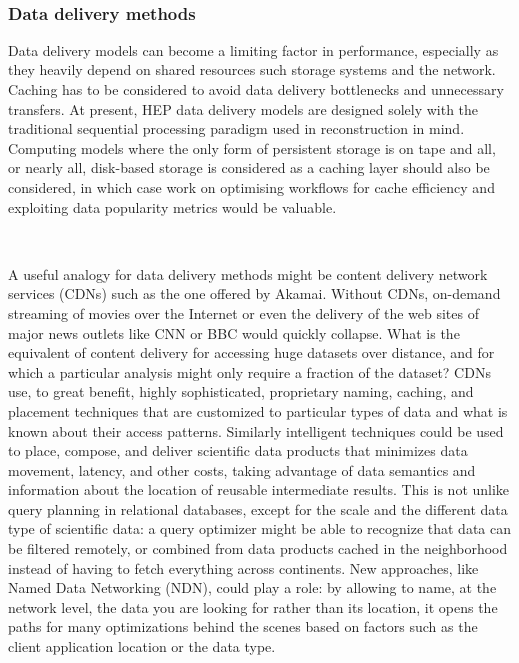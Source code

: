 \documentclass[12pt,a4paper]{article}
\begin{document}
~

\subsubsection{Data delivery methods}\label{data-delivery-methods}

Data delivery models can become a limiting factor in performance,
especially as they heavily depend on shared resources such storage
systems and the network. Caching has to be considered to avoid data
delivery bottlenecks and unnecessary transfers. At present, HEP data
delivery models are designed solely with the traditional sequential
processing paradigm used in reconstruction in mind. Computing models
where the only form of persistent storage is on tape and all, or nearly
all, disk-based storage is considered as a caching layer should also be
considered, in which case work on optimising workflows for cache
efficiency and exploiting data popularity metrics would be valuable.

~

A useful analogy for data delivery methods might be content delivery
network services (CDNs) such as the one offered by Akamai. Without CDNs,
on-demand streaming of movies over the Internet or even the delivery of
the web sites of major news outlets like CNN or BBC would quickly
collapse. What is the equivalent of content delivery for accessing huge
datasets over distance, and for which a particular analysis might only
require a fraction of the dataset? CDNs use, to great benefit, highly
sophisticated, proprietary naming, caching, and placement techniques
that are customized to particular types of data and what is known about
their access patterns. Similarly intelligent techniques could be used to
place, compose, and deliver scientific data products that minimizes data
movement, latency, and other costs, taking advantage of data semantics
and information about the location of reusable intermediate results.
This is not unlike query planning in relational databases, except for
the scale and the different data type of scientific data: a query
optimizer might be able to recognize that data can be filtered remotely,
or combined from data products cached in the neighborhood instead of
having to fetch everything across continents. New approaches, like Named
Data Networking (NDN), could play a role: by allowing to name, at the
network level, the data you are looking for rather than its location, it
opens the paths for many optimizations behind the scenes based on
factors such as the client application location or the data type.
\end{document}
